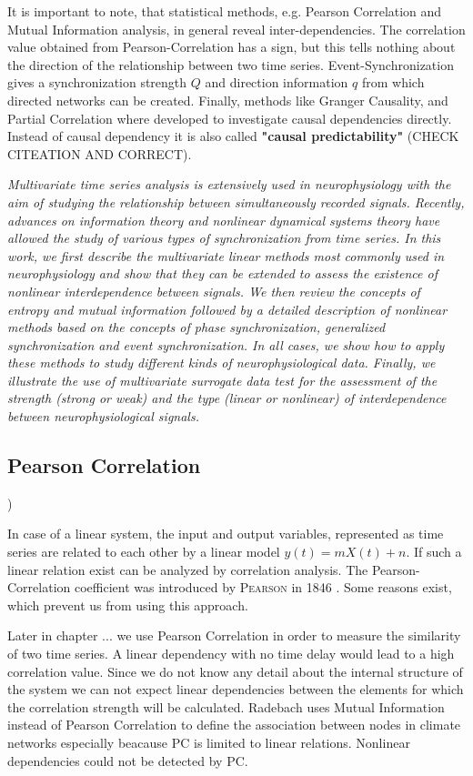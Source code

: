 \documentclass[a4paper,10pt]{scrbook}
\begin{document}
It is important to note, that statistical methods, e.g. Pearson Correlation and Mutual Information analysis, in general reveal inter-dependencies. The correlation value obtained from Pearson-Correlation has a sign, but this tells nothing about the direction of the relationship between two time series. Event-Synchronization gives a synchronization strength $Q$ and direction information $q$ from which directed networks can be created. Finally, methods like Granger Causality, and Partial Correlation where developed to investigate causal dependencies directly. Instead of causal dependency it is also called \textbf{"causal predictability"} (CHECK CITEATION AND CORRECT). 

\cite{Pereda2005}
\textit{Multivariate time series analysis is extensively used in neurophysiology with the aim of studying the relationship between simultaneously recorded signals. Recently, advances on information theory and nonlinear dynamical systems theory have allowed the study of various types of synchronization from time series. In this work, we first describe the multivariate linear methods most commonly used in neurophysiology and show that they can be extended to assess the existence of nonlinear interdependence between signals. We then review the concepts of entropy and mutual information followed by a detailed description of nonlinear methods based on the concepts of phase synchronization, generalized synchronization and event synchronization. In all cases, we show how to apply these methods to study different kinds of neurophysiological data. Finally, we illustrate the use of multivariate surrogate data test for the assessment of the strength (strong or weak) and the type (linear or nonlinear) of interdependence between neurophysiological signals.}

\subsection{Pearson Correlation}
\label{crosscorrelation.con})

In case of a linear system, the input and output variables, represented as time series are related to each other by a linear model $y(t) = m X(t) + n$. If such a linear relation exist can be analyzed by correlation analysis. The Pearson-Correlation coefficient was introduced by \textsc{Pearson} in \textsc{1846} \cite{Pearson1846}. 
Some reasons exist, which prevent us from using this approach. 

Later in chapter ... we use Pearson Correlation in order to measure the similarity of two time series. A linear dependency with no time delay would lead to a high correlation value. 
Since we do not know any detail about the internal structure of the system we can not expect linear dependencies between the elements for which the correlation strength will be calculated. Radebach \cite{Radebach2010} uses Mutual Information instead of Pearson Correlation to define the association between nodes in climate networks especially beacause PC is limited to linear relations. Nonlinear dependencies could not be detected by PC. 
\end{document}
